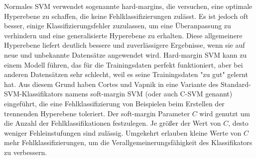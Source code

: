 \begin{figure}[h] 
\label{fig:kernel_trick} \end{figure} \vspace{0.5cm}


Normales SVM verwendet sogenannte hard-margins, die versuchen, eine optimale Hyperebene zu schaffen, die keine Fehlklassifizierungen zulässt. 
Es ist jedoch oft besser, einige Klassifizierungsfehler zuzulassen, um eine Überanpassung zu verhindern und eine generalisierte Hyperebene zu erhalten. Diese allgemeinere Hyperebene liefert deutlich bessere und zuverlässigere Ergebnisse, wenn sie auf neue und unbekannte Datensätze angewendet wird.
Hard-margin SVM kann zu einem Modell führen, das für die Trainingsdaten perfekt funktioniert, aber bei anderen Datensätzen sehr schlecht, weil es seine Trainingsdaten "zu gut" gelernt hat.
Aus diesem Grund haben Cortes und Vapnik in \cite{svn1995} eine Variante des Standard-SVM-Klassifikators namens soft-margin SVM (oder auch C-SVM genannt) eingeführt, die eine Fehlklassifizierung von Beispielen beim Erstellen der trennenden Hyperebene toleriert.
Der soft-margin Parameter $C$ wird genutzt um die Anzahl der Fehlklassifikationen festzulegen.
Je größer der Wert von $C$, desto weniger Fehleinstufungen sind zulässig.
Umgekehrt erlauben kleine Werte von $C$ mehr Fehlklassifizierungen, um die Verallgemeinerungsfähigkeit des Klassifikators zu verbessern. \\


